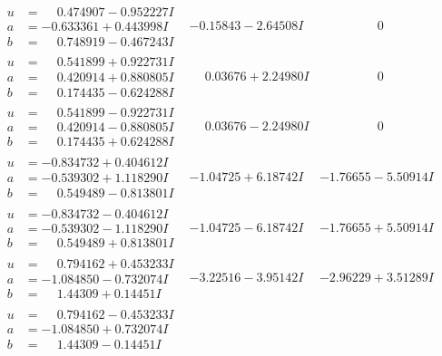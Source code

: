 \documentclass[1p]{elsarticle_modified}
\theoremstyle{definition}
\begin{document}
$$\begin{array}{c|c|c}
\begin{aligned}
u &= \phantom{-}0.474907 - 0.952227 I \\
a &= -0.633361 + 0.443998 I \\
b &= \phantom{-}0.748919 - 0.467243 I\end{aligned}
 & -0.15843 - 2.64508 I & \phantom{-0.000000 } 0 \\ \hline\begin{aligned}
u &= \phantom{-}0.541899 + 0.922731 I \\
a &= \phantom{-}0.420914 + 0.880805 I \\
b &= \phantom{-}0.174435 - 0.624288 I\end{aligned}
 & \phantom{-}0.03676 + 2.24980 I & \phantom{-0.000000 } 0 \\ \hline\begin{aligned}
u &= \phantom{-}0.541899 - 0.922731 I \\
a &= \phantom{-}0.420914 - 0.880805 I \\
b &= \phantom{-}0.174435 + 0.624288 I\end{aligned}
 & \phantom{-}0.03676 - 2.24980 I & \phantom{-0.000000 } 0 \\ \hline\begin{aligned}
u &= -0.834732 + 0.404612 I \\
a &= -0.539302 + 1.118290 I \\
b &= \phantom{-}0.549489 - 0.813801 I\end{aligned}
 & -1.04725 + 6.18742 I & -1.76655 - 5.50914 I \\ \hline\begin{aligned}
u &= -0.834732 - 0.404612 I \\
a &= -0.539302 - 1.118290 I \\
b &= \phantom{-}0.549489 + 0.813801 I\end{aligned}
 & -1.04725 - 6.18742 I & -1.76655 + 5.50914 I \\ \hline\begin{aligned}
u &= \phantom{-}0.794162 + 0.453233 I \\
a &= -1.084850 - 0.732074 I \\
b &= \phantom{-}1.44309 + 0.14451 I\end{aligned}
 & -3.22516 - 3.95142 I & -2.96229 + 3.51289 I \\ \hline\begin{aligned}
u &= \phantom{-}0.794162 - 0.453233 I \\
a &= -1.084850 + 0.732074 I \\
b &= \phantom{-}1.44309 - 0.14451 I\end{aligned}

\end{array}$$
\end{document}

